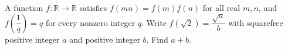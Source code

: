 A function $f:\mathbb R\to\mathbb R$ satisfies $f(mn)=f(m)f(n)$ for all real $m,n$, and $f(\dfrac{1}{q})=q$ for every nonzero integer $q$. Write $f(\sqrt2)=\dfrac{\sqrt a}{b}$ with squarefree positive integer $a$ and positive integer $b$. Find $a+b$.
